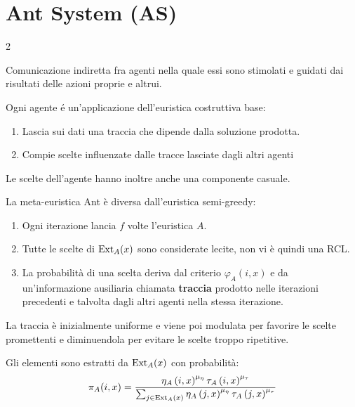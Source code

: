 \documentclass[\main/main.tex]{subfiles}
\begin{document}
\section{Ant System (AS)}
\begin{multicols}{2}
\begin{definition}[Stigmergia]
    Comunicazione indiretta fra agenti nella quale essi sono stimolati e guidati dai risultati delle azioni proprie e altrui.
\end{definition}
\begin{definition}[Agente]
    Ogni agente é un'applicazione dell'euristica costruttiva base:
    \begin{enumerate}
        \item Lascia sui dati una traccia che dipende dalla soluzione prodotta.
        \item Compie scelte influenzate dalle tracce lasciate dagli altri agenti
    \end{enumerate}
    Le scelte dell'agente hanno inoltre anche una componente casuale.   
\end{definition}
\begin{observation}
    La meta-euristica Ant è diversa dall'euristica semi-greedy:
    \begin{enumerate}
        \item Ogni iterazione lancia \(f\) volte l'euristica \(A\).
        \item Tutte le scelte di \(\text{Ext}_A(x)\) sono considerate lecite, non vi è quindi una RCL.
        \item La probabilità di una scelta deriva dal criterio \(\varphi_A(i, x)\) e da un'informazione ausiliaria chiamata \textbf{traccia} prodotto nelle iterazioni precedenti e talvolta dagli altri agenti nella stessa iterazione.
    \end{enumerate}
\end{observation}
\begin{observation}
    La traccia è inizialmente uniforme e viene poi modulata per favorire le scelte promettenti e diminuendola per evitare le scelte troppo ripetitive.
\end{observation}
\begin{observation}
    Gli elementi sono estratti da \(\text{Ext}_A(x)\) con probabilità:
    \[
        \pi_A(i, x) = \frac{\eta_A\left(i, x\right)^{\mu_\eta} \tau_A\left(i, x\right)^{\mu_\tau}}{\sum_{j \in \text{Ext}_A(x)} \eta_A\left(j, x\right)^{\mu_\eta} \tau_A\left(j, x\right)^{\mu_\tau}}
\]
\end{observation}
\end{multicols}
\end{document}
